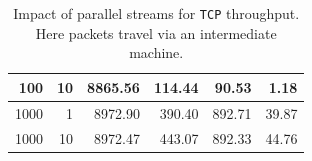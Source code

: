 \documentclass[12pt,a4paper]{report}
\begin{document}
\begin{table}[H]
\begin{tabular}{|r|r|r|r|r|r|}
100                                                                                             & 10                                                                                                                      & 8865.56                                                                                                                                    & 114.44                                                                                                                               & 90.53                                                                                                 & 1.18                                                                                                                               \\ \hline
1000                                                                                            & 1                                                                                                                       & 8972.90                                                                                                                                    & 390.40                                                                                                                               & 892.71                                                                                                & 39.87                                                                                                                              \\ \hline
1000                                                                                            & 10                                                                                                                      & 8972.47                                                                                                                                    & 443.07                                                                                                                               & 892.33                                                                                                & 44.76                                                                                                                              \\ \hline
\end{tabular}
    \centering
    \caption[Impact of parallel streams for \texttt{TCP} throughput]{Impact of parallel streams for \texttt{TCP} throughput. Here packets travel via an intermediate machine.}
    \label{fig:TCP_throughput_via_B_using_parallel_streams}
\end{table}
\end{document}
